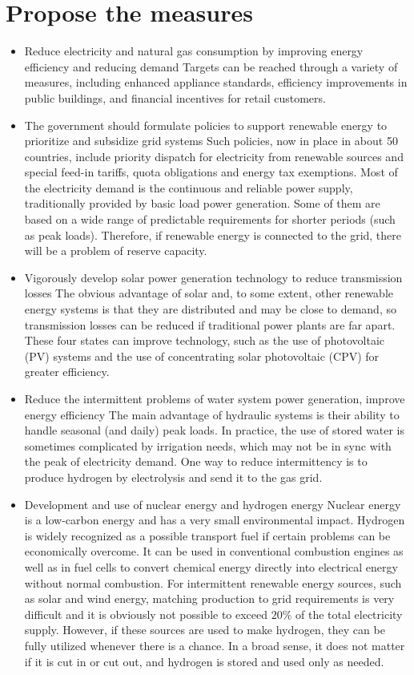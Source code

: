 \documentclass{mcmthesis}
\begin{document}
\section{Propose the measures}
\begin{itemize}
  \item Reduce electricity and natural gas consumption by improving energy efficiency and reducing demand
        Targets can be reached through a variety of measures, including enhanced appliance standards,
        efficiency improvements in public buildings, and financial incentives for retail customers.
  \item The government should formulate policies to support renewable energy to prioritize and subsidize grid systems
  Such policies, now in place in about 50 countries, include priority dispatch for electricity from renewable sources and special feed-in tariffs, quota obligations and energy tax exemptions.
  Most of the electricity demand is the continuous and reliable power supply, traditionally provided by basic load power generation. Some of them are based on a wide range of predictable requirements for shorter periods (such as peak loads).
  Therefore, if renewable energy is connected to the grid, there will be a problem of reserve capacity.
  \item Vigorously develop solar power generation technology to reduce transmission losses
The obvious advantage of solar and, to some extent, other renewable energy systems is that they are distributed and may be close to demand, so transmission losses can be reduced if traditional power plants are far apart.
These four states can improve technology, such as the use of photovoltaic (PV) systems and the use of concentrating solar photovoltaic (CPV) for greater efficiency.
  \item Reduce the intermittent problems of water system power generation, improve energy efficiency
  The main advantage of hydraulic systems is their ability to handle seasonal (and daily) peak loads. In practice, the use of stored water is sometimes complicated by irrigation needs, which may not be in sync with the peak of electricity demand.
One way to reduce intermittency is to produce hydrogen by electrolysis and send it to the gas grid.
  \item Development and use of nuclear energy and hydrogen energy
  Nuclear energy is a low-carbon energy and has a very small environmental impact.
Hydrogen is widely recognized as a possible transport fuel if certain problems can be economically overcome.
It can be used in conventional combustion engines as well as in fuel cells to convert chemical energy directly into electrical energy without normal combustion.
For intermittent renewable energy sources, such as solar and wind energy,
matching production to grid requirements is very difficult and it is obviously not possible to exceed $20\%$ of the total electricity supply.
However, if these sources are used to make hydrogen, they can be fully utilized whenever there is a chance.
In a broad sense, it does not matter if it is cut in or cut out, and hydrogen is stored and used only as needed.
\end{itemize}
\end{document}
